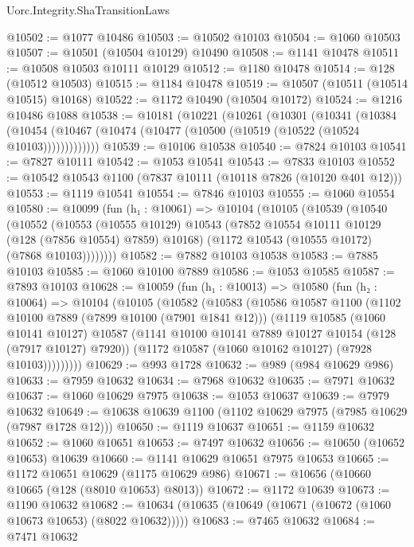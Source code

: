 \begin{lexlean}{Uorc.Integrity.ShaTransitionLaws}
\begin{coremodule}
@10502 := @1077 @10486
@10503 := @10502 @10103
@10504 := @1060 @10503
@10507 := @10501 (@10504 @10129) @10490
@10508 := @1141 @10478
@10511 := @10508 @10503 @10111 @10129
@10512 := @1180 @10478
@10514 := @128 (@10512 @10503)
@10515 := @1184 @10478
@10519 := @10507 (@10511 (@10514 @10515) @10168)
@10522 := @1172 @10490 (@10504 @10172)
@10524 := @1216 @10486 @1088
@10538 := @10181
    (@10221
      (@10261
        (@10301
          (@10341
            (@10384
              (@10454 (@10467 (@10474 (@10477 (@10500 (@10519 (@10522 (@10524 @10103)))))))))))))
@10539 := @10106 @10538
@10540 := @7824 @10103
@10541 := @7827 @10111
@10542 := @1053 @10541
@10543 := @7833 @10103
@10552 := @10542 @10543 @1100 (@7837 @10111 (@10118 @7826 (@10120 @401 @12)))
@10553 := @1119 @10541
@10554 := @7846 @10103
@10555 := @1060 @10554
@10580 := @10099
    (fun (h₁ : @10061) =>
    @10104
      (@10105
        (@10539
          (@10540
            (@10552
              (@10553
                (@10555 @10129)
                @10543
                (@7852 @10554 @10111 @10129 (@128 (@7856 @10554) @7859) @10168)
                (@1172 @10543 (@10555 @10172) (@7868 @10103))))))))
@10582 := @7882 @10103 @10538
@10583 := @7885 @10103
@10585 := @1060 @10100 @7889
@10586 := @1053 @10585
@10587 := @7893 @10103
@10628 := @10059
    (fun (h₁ : @10013) =>
    @10580
      (fun (h₂ : @10064) =>
      @10104
        (@10105
          (@10582
            (@10583
              (@10586
                @10587
                @1100
                (@1102 @10100 @7889 (@7899 @10100 (@7901 @1841 @12)))
                (@1119
                  @10585
                  (@1060 @10141 @10127)
                  @10587
                  (@1141 @10100 @10141 @7889 @10127 @10154 (@128 (@7917 @10127) @7920))
                  (@1172 @10587 (@1060 @10162 @10127) (@7928 @10103)))))))))
@10629 := @993 @1728
@10632 := @989 (@984 @10629 @986)
@10633 := @7959 @10632
@10634 := @7968 @10632
@10635 := @7971 @10632
@10637 := @1060 @10629 @7975
@10638 := @1053 @10637
@10639 := @7979 @10632
@10649 := @10638 @10639 @1100 (@1102 @10629 @7975 (@7985 @10629 (@7987 @1728 @12)))
@10650 := @1119 @10637
@10651 := @1159 @10632
@10652 := @1060 @10651
@10653 := @7497 @10632
@10656 := @10650 (@10652 @10653) @10639
@10660 := @1141 @10629 @10651 @7975 @10653
@10665 := @1172 @10651 @10629 (@1175 @10629 @986)
@10671 := @10656 (@10660 @10665 (@128 (@8010 @10653) @8013))
@10672 := @1172 @10639
@10673 := @1190 @10632
@10682 := @10634 (@10635 (@10649 (@10671 (@10672 (@1060 @10673 @10653) (@8022 @10632)))))
@10683 := @7465 @10632
@10684 := @7471 @10632

\end{coremodule}
\end{lexlean}
